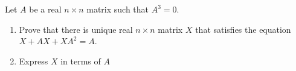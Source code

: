 Let $A$ be a real $n\times n$ matrix such that $A^3=0$.
\begin{enumerate}[label = (\alph*)]
	\item Prove that there is unique real $n\times n$ matrix $X$ that satisfies the equation $X+AX+XA^2=A$.
	\item Express $X$ in terms of $A$
\end{enumerate}
